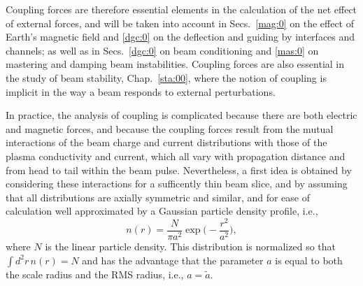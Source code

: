 \documentclass [12pt,a4paper,     ]{report} %
\begin{document}
   Coupling forces are therefore essential elements in the calculation of the net effect of external forces, and will be taken into account in Secs.~\ref{mag:0} on the effect of Earth's magnetic field and \ref{dgc:0} on the deflection and guiding by interfaces and channels; as well as in Secs.~\ref{dgc:0} on beam conditioning and \ref{mas:0} on mastering and damping beam instabilities.  Coupling forces are also essential in the study of beam stability, Chap.~\ref{sta:00}, where the notion of coupling is implicit in the way a beam responds to external perturbations.

   In practice, the analysis of coupling is complicated because there are both electric and magnetic forces, and because the coupling forces result from the mutual interactions of the beam charge and current distributions with those of the plasma conductivity and current, which all vary with propagation distance and from head to tail within the beam pulse.  Nevertheless, a first idea is obtained by considering these interactions for a sufficently thin beam slice, and by assuming that all distributions are axially symmetric and similar, and for ease of calculation well approximated by a Gaussian particle density profile, i.e.,
%
\begin{equation}\label{coh:1} %
     n(r) = \frac{N}{\pi a^2} \exp\bigl( -\frac{r^2}{a^2}\bigr),
\end{equation}
%
where $N$ is the linear particle density.  This distribution is normalized so that $\int d^2 r \, n(r) = N$ and has the advantage that the parameter $a$ is equal to both the scale radius and the RMS radius, i.e., $a = \tilde{a}$.
\end{document}
